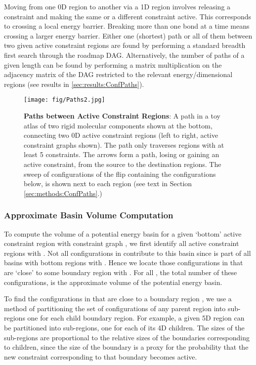 \documentclass[]{article}
\newcommand{\rmc}{rigid molecular component}
\begin{document}
Moving from one 0D region to another via a 1D region involves releasing a
constraint and making the same or a different constraint active. This
corresponds to crossing a local energy barrier. Breaking more than one bond at
a time means crossing a larger energy barrier. Either one (shortest) path or
all of them between two given active constraint regions are found by performing
a standard breadth first search through the roadmap DAG. Alternatively, the
number of paths of a given length can be found by performing a matrix
multiplication on the adjacency matrix of the DAG restricted to the relevant
energy/dimensional regions (see results in \ref{sec:results:ConfPaths}).

\begin{figure}[htpb]
\centering
\texttt{[image: fig/Paths2.jpg]}
\caption{\scriptsize \textbf{Paths between Active Constraint Regions}: A path 
in a toy atlas of two \rmc s shown at the bottom, connecting two 0D active 
constraint regions (left to right, active constraint graphs shown). 
The path only traverses regions with at least 5 constraints.
The arrows form a path, losing or gaining an active constraint, from the source 
to the destination regions. The sweep of configurations of the flip containing 
the configurations below, is shown next to each region (see text in Section 
\ref{sec:methods:ConfPaths}.)}
\label{fig:paths}
\end{figure}

\subsubsection{Approximate Basin Volume Computation}
\label{sec:methods:approximateVolume}
To compute the volume of a potential energy basin for a given `bottom'
active constraint region  with constraint graph , we first identify all
active constraint regions  with . Not all configurations
in  contribute to this basin since  is part of all basins with
bottom regions  with . Hence we locate those configurations
in  that are `close' to some boundary region  with .  For all , the total number of these
configurations, is the approximate volume of the potential energy basin.

To find the configurations in  that are close to a boundary region
, we use a method of partitioning the set of configurations of any
parent region into sub-regions one for each child boundary region.  For
example, a given 5D region can be partitioned into sub-regions, one for each of
its 4D children.  The sizes of the sub-regions are proportional to the relative
sizes of the boundaries corresponding to children, since the size of the
boundary is a proxy for the probability that the new constraint corresponding
to that boundary becomes active. 
\end{document}
